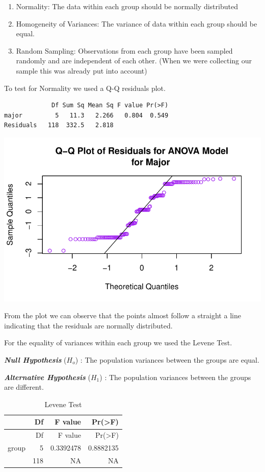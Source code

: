 \documentclass[
  letterpaper,
  DIV=11,
  numbers=noendperiod]{scrartcl}
\providecommand{\tightlist}{%
  \setlength{\itemsep}{0pt}\setlength{\parskip}{0pt}}\usepackage{longtable,booktabs,array}
\begin{document}
\begin{enumerate}
\def\labelenumi{\arabic{enumi}.}
\tightlist
\item
  Normality: The data within each group should be normally distributed
\item
  Homogeneity of Variances: The variance of data within each group
  should be equal.
\item
  Random Sampling: Observations from each group have been sampled
  randomly and are independent of each other. (When we were collecting
  our sample this was already put into account)
\end{enumerate}

To test for Normality we used a Q-Q residuals plot.

\begin{verbatim}
             Df Sum Sq Mean Sq F value Pr(>F)
major         5   11.3   2.266   0.804  0.549
Residuals   118  332.5   2.818               
\end{verbatim}

\includegraphics{technical_report_files/figure-pdf/r2-1.pdf}

From the plot we can observe that the points almost follow a straight a
line indicating that the residuals are normally distributed.

For the equality of variances within each group we used the Levene Test.

\textbf{\emph{Null Hypothesis}} (\(H_{o}\)) : The population variances
between the groups are equal.

\textbf{\emph{Alternative Hypothesis}} (\(H_{1}\)) : The population
variances between the groups are different.

\begin{longtable}[]{@{}lrrr@{}}
\caption{Levene Test}\tabularnewline
\toprule\noalign{}
& Df & F value & Pr(\textgreater F) \\
\midrule\noalign{}
\endfirsthead
\toprule\noalign{}
& Df & F value & Pr(\textgreater F) \\
\midrule\noalign{}
\endhead
\bottomrule\noalign{}
\endlastfoot
group & 5 & 0.3392478 & 0.8882135 \\
& 118 & NA & NA \\
\end{longtable}
\end{document}
